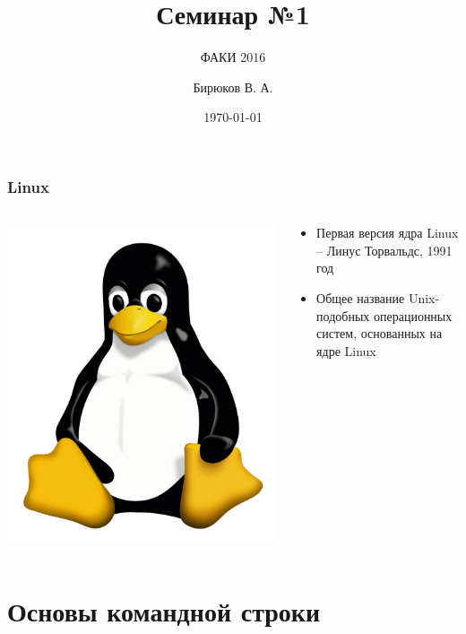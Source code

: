 \documentclass[12pt,pdf,hyperref={unicode}]{beamer}
\title{Семинар №1}
\subtitle{ФАКИ 2016}
\author{Бирюков В. А.}
\date{\today}
\begin{document}
\begin{frame}
\titlepage
\end{frame} 

\begin{frame}
\frametitle{Linux} 
\begin{columns}
\begin{column}{0.4\textwidth}
   \includegraphics[width=0.75\linewidth]{tux.png}
\end{column}
\begin{column}{0.6\textwidth}  %
    \begin{itemize}
    \item Первая версия ядра Linux -- Линус Торвальдс, 1991 год
    \item Общее название Unix-подобных операционных систем, основанных на ядре Linux
    
    \end{itemize}
\end{column}
\end{columns}


\end{frame}

\section{Основы командной строки}
\end{document}
